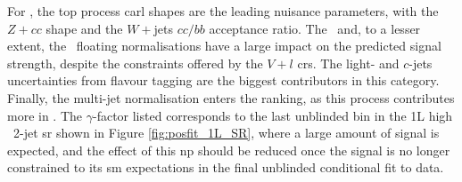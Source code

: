 For \vhc, the top process \gls{carl} shapes are the leading nuisance parameters, with the $Z+cc$ shape and the $W+$jets $cc/bb$ acceptance ratio. The \zlf\ and, to a lesser extent, the \wlf\ floating normalisations have a large impact on the predicted signal strength, despite the constraints offered by the $V+l$ \glspl{cr}. The light- and $c$-jets uncertainties from flavour tagging are the biggest contributors in this category. Finally, the multi-jet normalisation enters the ranking, as this process contributes more in \vhc. The $\gamma$-factor listed corresponds to the last unblinded bin in the 1L high \ptv\ 2-jet \gls{sr} shown in Figure \ref{fig:posfit_1L_SR}, where a large amount of signal is expected, and the effect of this \gls{np} should be reduced once the signal is no longer constrained to its \gls{sm} expectations in the final unblinded conditional fit to data. 

